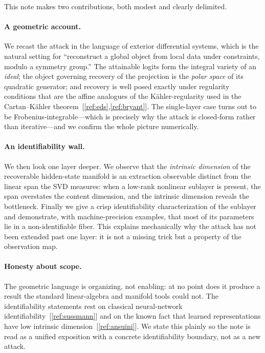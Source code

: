 \documentclass[11pt]{article}
\begin{document}
This note makes two contributions, both modest and clearly delimited.

\paragraph{A geometric account.} We recast the attack in the language of
exterior differential systems, which is the natural setting for ``reconstruct a
global object from local data under constraints, modulo a symmetry group.'' The
attainable logits form the integral variety of an \emph{ideal}; the object
governing recovery of the projection is the \emph{polar space} of its quadratic
generator; and recovery is well posed exactly under regularity conditions that
are the affine analogues of the K\"ahler-regularity used in the Cartan--K\"ahler
theorem~[\ref{ref:eds},\ref{ref:bryant}]. The single-layer case turns out to be
Frobenius-integrable---which is precisely why the attack is closed-form rather
than iterative---and we confirm the whole picture numerically.

\paragraph{An identifiability wall.} We then look one layer deeper. We observe
that the \emph{intrinsic dimension} of the recoverable hidden-state manifold is
an extraction observable distinct from the linear span the SVD measures: when a
low-rank nonlinear sublayer is present, the span overstates the content
dimension, and the intrinsic dimension reveals the bottleneck. Finally we give a
crisp identifiability characterization of the sublayer and demonstrate, with
machine-precision examples, that most of its parameters lie in a non-identifiable
fiber. This explains mechanically why the attack has not been extended past one
layer: it is not a missing trick but a property of the observation map.

\paragraph{Honesty about scope.} The geometric language is organizing, not
enabling: at no point does it produce a result the standard linear-algebra and
manifold tools could not. The identifiability statements rest on classical
neural-network identifiability~[\ref{ref:sussmann}] and on the known fact that
learned representations have low intrinsic dimension~[\ref{ref:ansuini}]. We
state this plainly so the note is read as a unified exposition with a concrete
identifiability boundary, not as a new attack.
\end{document}
